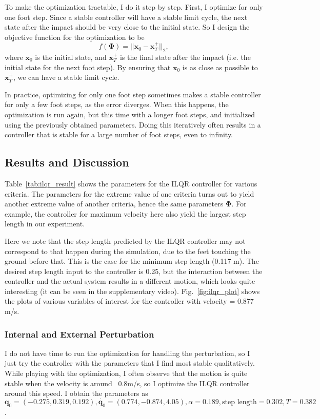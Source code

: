 To make the optimization tractable, I do it step by step. First, I optimize for only one foot step. Since a stable controller will have a stable limit cycle, the next state after the impact should be very close to the initial state. So I design the objective function for the optimization to be 
\begin{equation}
f(\bm{\Phi}) = ||\bm{x}_0 - \bm{x}_T^+ ||_2,
\end{equation}
where $\bm{x}_0$ is the initial state, and $\bm{x}_T^+$ is the final state after the impact (i.e. the initial state for the next foot step). By ensuring that $\bm{x}_0$ is as close as possible to $\bm{x}_T^+$, we can have a stable limit cycle. 

In practice, optimizing for only one foot step sometimes makes a stable controller for only a few foot steps, as the error diverges. When this happens, the optimization is run again, but this time with a longer foot steps, and initialized using the previously obtained parameters. Doing this iteratively often results in a controller that is stable for a large number of foot steps, even to infinity. 

\subsection{Results and Discussion}
\label{sec:results}

Table~\ref{tab:ilqr_result} shows the parameters for the ILQR controller for various criteria. The parameters for the extreme value of one criteria turns out to yield another extreme value of another criteria, hence the same parameters $\bm{\Phi}$. For example, the controller for maximum velocity here also yield the largest step length in our experiment. 

Here we note that the step length predicted by the ILQR controller may not correspond to that happen during the simulation, due to the feet touching the ground before that. This is the case for the minimum step length (0.117 m). The desired step length input to the controller is 0.25, but the interaction between the controller and the actual system results in a different motion, which looks quite interesting (it can be seen in the supplementary video). Fig.~\ref{fig:ilqr_plot} shows the plots of various variables of interest for the controller with velocity = 0.877 m/s. 

\subsubsection{Internal and External Perturbation}
I do not have time to run the optimization for handling the perturbation, so I just try the controller with the parameters that I find most stable qualitatively. While playing with the optimization, I often observe that the motion is quite stable when the velocity is around ~0.8m/s, so I optimize the ILQR controller around this speed. I obtain the parameters as $\bm{q}_0 = (-0.275,  0.319,  0.192),\dot{\bm{q}_0} = (0.774, -0.874,  4.05), \alpha = 0.189, \text{step length} = 0.302, T = 0.382$.


